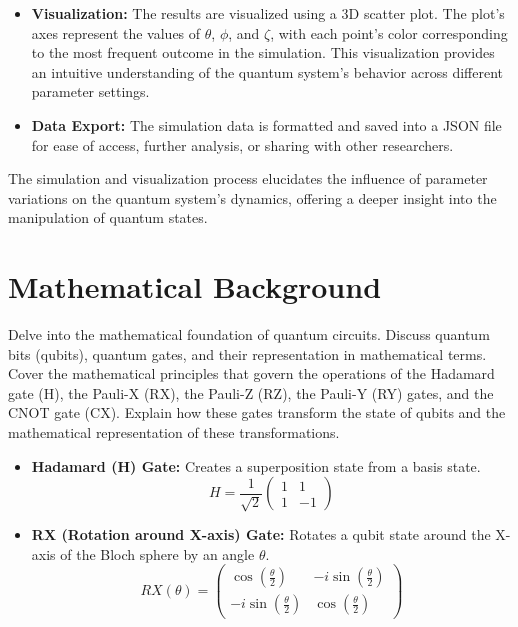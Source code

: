 \documentclass{article}
\begin{document}
\begin{multicols}{2}
\begin{itemize}
    \item \textbf{Visualization:} The results are visualized using a 3D scatter plot. The plot's axes represent the values of $\theta$, $\phi$, and $\zeta$, with each point's color corresponding to the most frequent outcome in the simulation. This visualization provides an intuitive understanding of the quantum system's behavior across different parameter settings.
    
    \item \textbf{Data Export:} The simulation data is formatted and saved into a JSON file for ease of access, further analysis, or sharing with other researchers.
\end{itemize}

The simulation and visualization process elucidates the influence of parameter variations on the quantum system's dynamics, offering a deeper insight into the manipulation of quantum states.

\section{Mathematical Background}
Delve into the mathematical foundation of quantum circuits. Discuss quantum bits (qubits), quantum gates, and their representation in mathematical terms. Cover the mathematical principles that govern the operations of the Hadamard gate (H), the Pauli-X (RX), the Pauli-Z (RZ), the Pauli-Y (RY) gates, and the CNOT gate (CX). Explain how these gates transform the state of qubits and the mathematical representation of these transformations.

\begin{itemize}
        \item \textbf{Hadamard (H) Gate:} Creates a superposition state from a basis state.
        \[
        H = \frac{1}{\sqrt{2}}
        \begin{pmatrix}
            1 & 1 \\
            1 & -1
        \end{pmatrix}
        \]
        
        \item \textbf{RX (Rotation around X-axis) Gate:} Rotates a qubit state around the X-axis of the Bloch sphere by an angle $\theta$.
        \[
        RX(\theta) = 
        \begin{pmatrix}
            \cos\left(\frac{\theta}{2}\right) & -i\sin\left(\frac{\theta}{2}\right) \\
            -i\sin\left(\frac{\theta}{2}\right) & \cos\left(\frac{\theta}{2}\right)
        \end{pmatrix}
        \]
        

\end{itemize}
\end{multicols}
\end{document}
